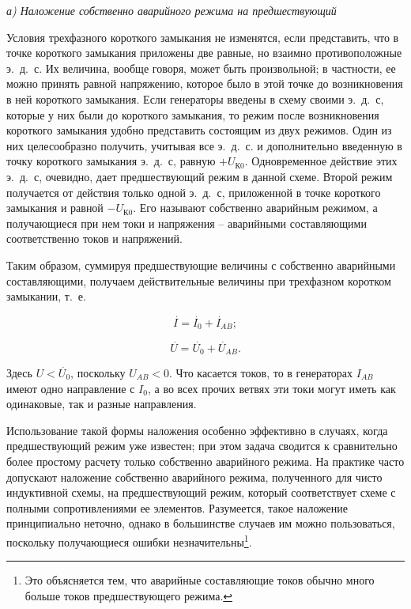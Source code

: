 \vspace{1pc}
\textit{а) Наложение собственно аварийного режима на предшествующий}

Условия трехфазного короткого замыкания не изменятся, если представить, что в точке короткого замыкания приложены две равные, но взаимно противоположные э.~д.~с. Их величина, вообще говоря, может быть произвольной; в частности, ее можно принять равной напряжению, которое было в этой точке до возникновения в ней короткого замыкания. Если генераторы введены в схему своими э.~д.~с, которые у них были до короткого замыкания, то режим после возникновения короткого замыкания удобно представить состоящим из двух режимов. Один из них целесообразно получить, учитывая все э.~д.~с. и дополнительно введенную в точку короткого замыкания э.~д.~с, равную $ + U_{\text{К0}} $. Одновременное действие этих э.~д.~с, очевидно, дает предшествующий режим в данной схеме. Второй режим получается от действия только одной э.~д.~с, приложенной в точке короткого замыкания и равной $ -U_{\text{К0}} $. Его называют собственно аварийным режимом, а получающиеся при нем токи и напряжения -- аварийными составляющими соответственно токов и напряжений.

Таким образом, суммируя предшествующие величины с собственно аварийными составляющими, получаем действительные величины при трехфазном коротком замыкании, т.~е.

\begin{equation}
	\label{eq:2-33 I_as_summ}
	\overset{\;.}{I} = \overset{\;.}{I}_0 + \overset{\;.}{I}_{AB};
\end{equation}

\begin{equation}
	\label{eq:2-34 U_as_summ}
	\overset{\;.}{U} = \overset{\;.}{U}_0 + \overset{\;.}{U}_{AB}.
\end{equation}

Здесь $ U < \overset{\;.}{U}_0 $, поскольку $ U_{AB} < 0 $. Что касается токов, то в генераторах $ I_{AB} $ имеют одно направление с $ I_0 $, а во всех прочих ветвях эти токи могут иметь как одинаковые, так и разные направления.

Использование такой формы наложения особенно эффективно в случаях, когда предшествующий режим уже известен; при этом задача сводится к сравнительно более простому расчету только собственно аварийного режима. На практике часто допускают наложение собственно аварийного режима, полученного для чисто индуктивной схемы, на предшествующий режим, который соответствует схеме с полными сопротивлениями ее элементов. Разумеется, такое наложение принципиально неточно, однако в большинстве случаев им можно пользоваться, поскольку получающиеся ошибки незначительны\footnote{Это объясняется тем, что аварийные составляющие токов обычно много больше токов предшествующего режима.}.

